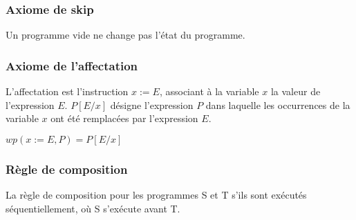 \documentclass[9pt]{book}
\begin{document}
		\subsubsection{Axiome de skip}
		
		


\par
Un programme vide ne change pas l'\'etat du programme.
		\subsubsection{Axiome de l'affectation}
		L'affectation est l'instruction $x := E$, associant \`a la variable $x$ la valeur de l'expression $E$. $P[ E/x]$ d\'esigne l'expression $P$ dans laquelle les occurrences de la variable $x$ ont \'et\'e remplac\'ees par l'expression $E$.


\par
 $wp(x := E, P) = P[E/x]$
\subsubsection{R\`egle de composition}

La r\`egle de composition pour les programmes S et T s'ils sont ex\'ecut\'es s\'equentiellement, o\`u S s'ex\'ecute avant T.
\end{document}
